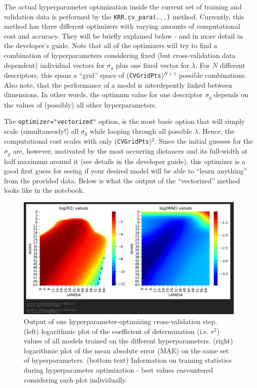 \documentclass[12pt]{achemso}
\begin{document}
\noindent The actual hyperparameter optimization inside the current set of training and validation data is performed by the \texttt{KRR.cv\_para(...)} method. Currently, this method has three different optimizers with varying amounts of computational cost and accuracy. They will be briefly explained below - and in more detail in the developer's guide. Note that all of the optimizers will try to find a combination of hyperparameters considering fixed (but cross-validation data dependent) individual vectors for $\sigma_g$ plus one fixed vector for $\lambda$. For $N$ different descriptors, this spans a ``grid'' space of (\texttt{CVGridPts})$^{N+1}$ possible combinations. Also note, that the performance of a model is interdepently linked between dimensions. In other words, the optimum value for one descriptor $\sigma_g$ depends on the values of (possibly) all other hyperparameters.

\noindent The \texttt{optimizer="vectorized"} option, is the most basic option that will simply scale (simultaneosly!) all $\sigma_g$ while looping through all possible $\lambda$. Hence, the computational cost scales with only (\texttt{CVGridPts})$^2$. Since the initial guesses for the $\sigma_g$ are, however, motivated by the most occurring distances and its full-width at half maximum around it (see details in the developer guide), this optimizer is a good first guess for seeing if your desired model will be able to ``learn anything'' from the provided data. Below is what the output of the ``vectorized'' method looks like in the notebook.

\begin{figure}
  \centering
   \includegraphics[width=15.5cm]{./resources/03_CrossValidation_Out.png}
  \caption{Output of one hyperparameter-optimizing cross-validation step. (left) logarithmic plot of the coefficient of determination (i.e. $r^2$) values of all models trained on the different hyperparameters. (right) logarithmic plot of the mean absolute error (MAE) on the same set of hyperparameters. (bottom text) Information on training statistics during hyperparameter optimization - best values encountered considering each plot individually.}
  \label{FIG: 03_CV_Output}
\end{figure}
\end{document}
